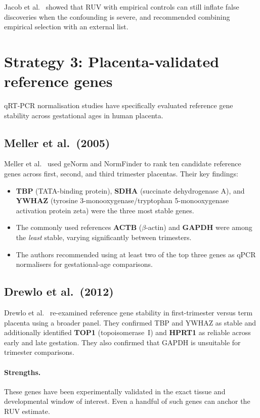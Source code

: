 \documentclass[11pt,a4paper]{article}
\begin{document}
Jacob et al.~\cite{jacob2016} showed that RUV with empirical controls
can still inflate false discoveries when the confounding is severe,
and recommended combining empirical selection with an external list.


\section{Strategy 3: Placenta-validated reference genes}

qRT-PCR normalisation studies have specifically evaluated reference
gene stability across gestational ages in human placenta.

\subsection{Meller et al.\ (2005)}

Meller et al.~\cite{meller2005} used geNorm and NormFinder to rank
ten candidate reference genes across first, second, and third
trimester placentas.  Their key findings:

\begin{itemize}
  \item \textbf{TBP} (TATA-binding protein), \textbf{SDHA} (succinate
        dehydrogenase A), and \textbf{YWHAZ} (tyrosine
        3-monooxygenase/tryptophan 5-monooxygenase activation protein
        zeta) were the three most stable genes.
  \item The commonly used references \textbf{ACTB} ($\beta$-actin)
        and \textbf{GAPDH} were among the \emph{least} stable,
        varying significantly between trimesters.
  \item The authors recommended using at least two of the top three
        genes as qPCR normalisers for gestational-age comparisons.
\end{itemize}

\subsection{Drewlo et al.\ (2012)}

Drewlo et al.~\cite{drewlo2012} re-examined reference gene stability
in first-trimester versus term placenta using a broader panel.  They
confirmed TBP and YWHAZ as stable and additionally identified
\textbf{TOP1} (topoisomerase~I) and \textbf{HPRT1} as reliable
across early and late gestation.  They also confirmed that GAPDH is
unsuitable for trimester comparisons.

\paragraph{Strengths.}
These genes have been experimentally validated in the exact tissue and
developmental window of interest.  Even a handful of such genes can
anchor the RUV estimate.
\end{document}
